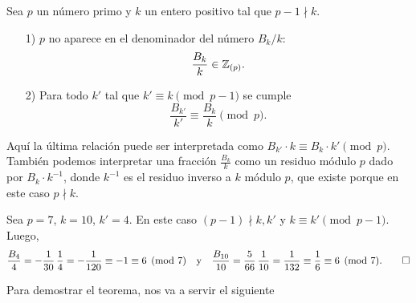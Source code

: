 \documentclass{article}
\numberwithin{equation}{section}
\theoremstyle{definition}
\begin{document}
\begin{teorema}[Kummer, 1851]
  \label{thm:congruencias-de-kummer}
  Sea $p$ un número primo y $k$ un entero positivo tal que $p-1 \nmid k$.

  \begin{enumerate}
  \item[1)] $p$ no aparece en el denominador del número $B_k/k$:
    $$\frac{B_k}{k} \in \mathbb{Z}_{(p)}.$$

  \item[2)] Para todo $k'$ tal que $k' \equiv k \pmod{p-1}$ se cumple
    $$\frac{B_{k'}}{k'} \equiv \frac{B_k}{k} \pmod{p}.$$
  \end{enumerate}
\end{teorema}

Aquí la última relación puede ser interpretada como
$B_{k'}\cdot k \equiv B_k\cdot k' \pmod{p}$. También podemos interpretar una
fracción $\frac{B_k}{k}$ como un residuo módulo $p$ dado por $B_k\cdot k^{-1}$,
donde $k^{-1}$ es el residuo inverso a $k$ módulo $p$, que existe porque en este
caso $p \nmid k$.

\begin{ejemplo}
  Sea $p = 7$, $k = 10$, $k' = 4$. En este caso $(p-1) \nmid k, k'$ y
  $k \equiv k' \pmod{p-1}$. Luego,
  \[ \frac{B_4}{4} = -\frac{1}{30}\,\frac{1}{4} = -\frac{1}{120} \equiv -1 \equiv 6 \pmod{7}
    \quad\text{y}\quad
    \frac{B_{10}}{10} = \frac{5}{66}\,\frac{1}{10} = \frac{1}{132} \equiv \frac{1}{6} \equiv 6 \pmod{7}.
  \qedhere \]
\end{ejemplo}

Para demostrar el teorema, nos va a servir el siguiente
\end{document}
